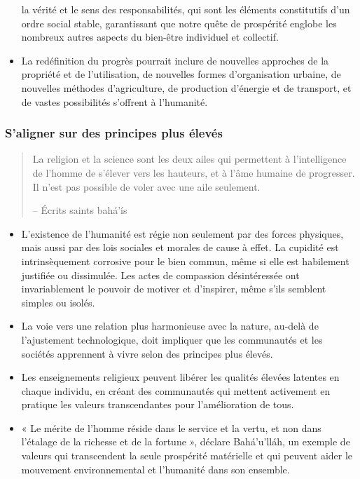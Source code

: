 \documentclass[11pt,xcolor={dvipsnames},hyperref={pdftex,pdfpagemode=UseNone,hidelinks,pdfdisplaydoctitle=true},usepdftitle=false]{beamer}
\begin{document}
\begin{frame}[allowframebreaks=0.8]
\begin{itemize}
      la vérité et le sens des responsabilités, qui sont les éléments
      constitutifs d'un ordre social stable, garantissant que notre quête de
      prospérité englobe les nombreux autres aspects du bien-être individuel et
      collectif.
    \item La redéfinition du progrès pourrait inclure de nouvelles approches de
      la propriété et de l'utilisation, de nouvelles formes d'organisation
      urbaine, de nouvelles méthodes d'agriculture, de production d'énergie et
      de transport, et de vastes possibilités s'offrent à l'humanité.
  \end{itemize}
\end{frame}

\begin{frame}[allowframebreaks=0.8]
  \frametitle{S’aligner sur des principes plus élevés}
  \begin{quote}
    La religion et la science sont les deux ailes qui permettent à
    l’intelligence de l’homme de s’élever vers les hauteurs, et à l’âme humaine
    de progresser. Il n’est pas possible de voler avec une aile seulement.

    \raggedleft -- Écrits saints bahá’ís
  \end{quote}
  \begin{itemize}
    \item L'existence de l'humanité est régie non seulement par des forces
      physiques, mais aussi par des lois sociales et morales de cause à effet.
      La cupidité est intrinsèquement corrosive pour le bien commun, même si
      elle est habilement justifiée ou dissimulée. Les actes de compassion
      désintéressée ont invariablement le pouvoir de motiver et d'inspirer, même
      s'ils semblent simples ou isolés.
    \item La voie vers une relation plus harmonieuse avec la nature, au-delà de
      l'ajustement technologique, doit impliquer que les communautés et les
      sociétés apprennent à vivre selon des principes plus élevés.
    \item Les enseignements religieux peuvent libérer les qualités élevées
      latentes en chaque individu, en créant des communautés qui mettent
      activement en pratique les valeurs transcendantes pour l'amélioration de
      tous.
    \item « Le mérite de l'homme réside dans le service et la vertu, et non dans
      l'étalage de la richesse et de la fortune », déclare Bahá'u'lláh, un
      exemple de valeurs qui transcendent la seule prospérité matérielle et qui
      peuvent aider le mouvement environnemental et l'humanité dans son
      ensemble.
  \end{itemize}
\end{frame}
\end{document}
